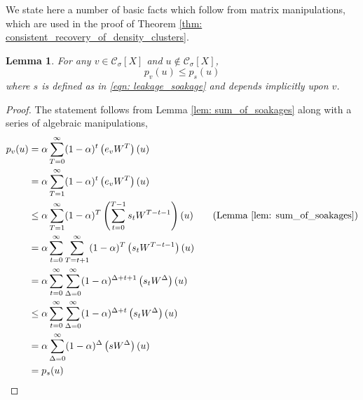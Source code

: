 \documentclass{article}
\newcommand{\1}{\mathbf{1}}
\newcommand{\pbf}{p}        %
\newcommand{\Xbf}{X}             %
\newcommand{\Wbf}{W}
\newcommand{\Cset}{\mathcal{C}}
\newcommand{\Csig}{\Cset_{\sigma}}
\theoremstyle{aldenthm}
\newtheorem{lemma}{Lemma}
\theoremstyle{aldenrmrk}
\begin{document}
We state here a number of basic facts which follow from matrix manipulations, which are used in the proof of Theorem \ref{thm: consistent_recovery_of_density_clusters}. 

\begin{lemma}
	\label{lem: soakage_ppr_lb}
	For any $v \in \Csig[\Xbf]$ and $u \not\in \Csig[\Xbf]$,
	\begin{equation*}
	\pbf_{v}(u) \leq \pbf_{s}(u)
	\end{equation*}
	where $s$ is defined as in \eqref{eqn: leakage_soakage} and depends implicitly upon $v$.
\end{lemma}
\begin{proof}
	The statement follows from Lemma \ref{lem: sum_of_soakages} along with a series of algebraic manipulations,
	\begin{align*}
	\pbf_v(u) & = \alpha\sum_{T = 0}^{\infty} (1 - \alpha)^t \left(e_v \Wbf^T\right)(u) \\
	& = \alpha\sum_{T = 1}^{\infty} (1 - \alpha)^t \left(e_v \Wbf^T\right)(u) \\
	& \leq \alpha \sum_{T=1}^{\infty} (1 - \alpha)^T \left( \sum_{t = 0}^{T - 1} s_t \Wbf^{T - t - 1} \right)(u) \tag{Lemma \ref{lem: sum_of_soakages}}\\
	& = \alpha \sum_{t=0}^{\infty} \sum_{T = t + 1}^{\infty} (1 - \alpha)^T \left( s_t \Wbf^{T - t - 1} \right)(u)\\
	& = \alpha \sum_{t=0}^{\infty} \sum_{\Delta = 0}^{\infty} (1 - \alpha)^{\Delta + t + 1} \left( s_t \Wbf^{\Delta} \right)(u) \\
	& \leq \alpha \sum_{t=0}^{\infty} \sum_{\Delta = 0}^{\infty} (1 - \alpha)^{\Delta + t } \left( s_t \Wbf^{\Delta} \right)(u) \\
	& = \alpha \sum_{\Delta = 0}^{\infty} (1 - \alpha)^{\Delta} \left(s \Wbf^{\Delta}\right)(u) \\
	& = \pbf_s(u)
	\end{align*}
\end{proof}
\end{document}
